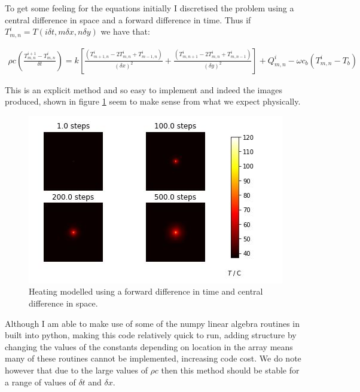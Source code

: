 \documentclass[11pt]{article} %
\begin{document}
To get some feeling for the equations initially I discretised the problem using a central difference in space and a forward difference in time. Thus if $T^i_{m,n}= T(i\delta t, m\delta x, n\delta y)$ we have that:

\begin{eqnarray}
\rho c \left( \frac{T^{i+1}_{m,n}-T^i_{m,n}}{\delta t}\right)= k\left[  \frac{(T^i_{m+1,n}-2T^i_{m,n}+T^i_{m-1,n})}{(\delta x)^2}+\frac{(T^i_{m,n+1}-2T^i_{m,n}+T^i_{m,n-1})}{(\delta y)^2}\right] +Q^i_{m,n}-\omega c_b(T^i_{m,n}-T_b) \label{euler method}
\end{eqnarray}

This is an explicit method and so easy to implement and indeed the images produced, shown in figure \ref{fig:forwardcentraldifference} seem to make sense from what we expect physically. 

\begin{figure}
	\centering
	\includegraphics[width=0.9\linewidth]{Report_images/forward_central_difference}
	\caption{Heating modelled using a forward difference in time and central difference in space.}
	\label{fig:forwardcentraldifference}
\end{figure}

Although I am able to make use of some of the numpy linear algebra routines in built into python, making this code relatively quick to run, adding structure by changing the values of the constants depending on location in the array means many of these routines cannot be implemented, increasing code cost. We do note however that due to the large values of $\rho c$ then this method should be stable for a range of values of $\delta t$ and $\delta x$.
\end{document}
